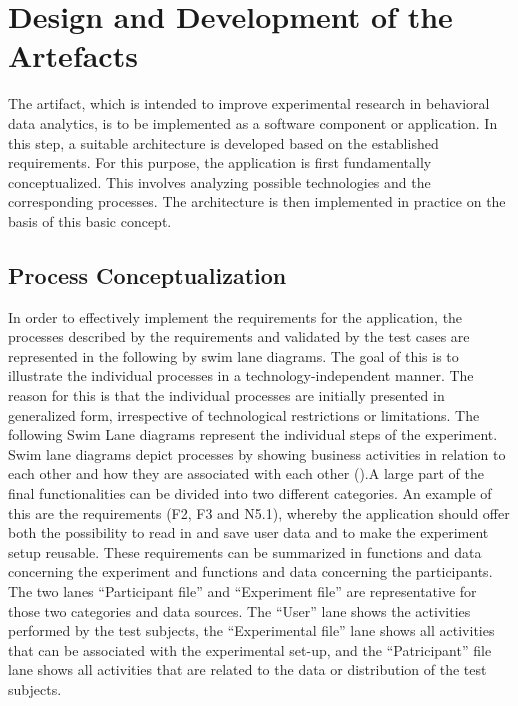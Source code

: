 \newpage\section{Design and Development of the Artefacts}

The artifact, which is intended to improve experimental research in behavioral data analytics, is to be implemented as a software component or application. In this step, a suitable architecture is developed based on the established requirements. For this purpose, the application is first fundamentally conceptualized. This involves analyzing possible technologies and the corresponding processes. The architecture is then implemented in practice on the basis of this basic concept.

\subsection{Process Conceptualization}\label{subsec:ProcessConcept}



In order to effectively implement the requirements for the application, the processes described by the requirements and validated by the test cases are represented in the following by swim lane diagrams. The goal of this is to illustrate the individual processes in a technology-independent manner. The reason for this is that the individual processes are initially presented in generalized form, irrespective of technological restrictions or limitations. The following Swim Lane diagrams represent the individual steps of the experiment. Swim lane diagrams depict processes by showing business activities in relation to each other and how they are associated with each other (\cite{Caudle.2009}).A large part of the final functionalities can be divided into two different categories. An example of this are the requirements (F2, F3 and N5.1), whereby the application should offer both the possibility to read in and save user data and to make the experiment setup reusable. These requirements can be summarized in functions and data concerning the experiment and functions and data concerning the participants. The two lanes \enquote{Participant file} and \enquote{Experiment file} are representative for those two categories and data sources. The \enquote{User} lane shows the activities performed by the test subjects, the \enquote{Experimental file} lane shows all activities that can be associated with the experimental set-up, and the \enquote{Patricipant} file lane shows all activities that are related to the data or distribution of the test subjects. 

